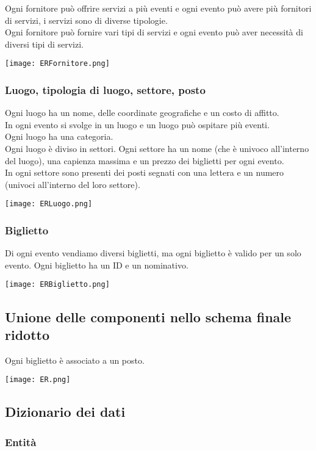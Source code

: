 \documentclass[a4paper,11pt]{article}
\begin{document}
Ogni fornitore può offrire servizi a più eventi e ogni evento può avere più fornitori di servizi, i servizi sono di diverse tipologie.\\
Ogni fornitore può fornire vari tipi di servizi e ogni evento può aver necessità di diversi tipi di servizi.

\texttt{[image: ERFornitore.png]}

\subsubsection*{Luogo, tipologia di luogo, settore, posto}

Ogni luogo ha un nome, delle coordinate geografiche e un costo di affitto.\\
In ogni evento si svolge in un luogo e un luogo può ospitare più eventi.\\
Ogni luogo ha una categoria.\\
Ogni luogo è diviso in settori.
Ogni settore ha un nome (che è univoco all'interno del luogo), una capienza massima e un prezzo dei biglietti per ogni evento.\\
In ogni settore sono presenti dei posti segnati con una lettera e un numero (univoci all'interno del loro settore).

\texttt{[image: ERLuogo.png]}

\subsubsection*{Biglietto}

Di ogni evento vendiamo diversi biglietti, ma ogni biglietto è valido per un solo evento.
Ogni biglietto ha un ID e un nominativo.

\texttt{[image: ERBiglietto.png]}

\subsection{Unione delle componenti nello schema finale ridotto}

Ogni biglietto è associato a un posto.

\texttt{[image: ER.png]}

\subsection{Dizionario dei dati}

\subsubsection*{Entità}
\end{document}
